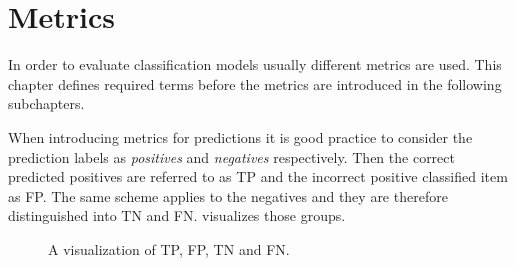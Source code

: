 \section{Metrics}
\label{chp:fundamentals:sec:metrics}

In order to evaluate classification models usually different metrics are used.
This chapter defines required terms before the metrics are introduced in the following subchapters.

When introducing metrics for predictions it is good practice to consider the prediction labels as \textit{positives} and \textit{negatives} respectively.
Then the correct predicted positives are referred to as \ac{TP} and the incorrect positive classified item as \ac{FP}.
The same scheme applies to the negatives and they are therefore distinguished into \ac{TN} and \ac{FN}.
 visualizes those groups. \parencite{Powers:2011}

\begin{figure}[htpb]
    \centering
    \def\svgwidth{\columnwidth}
    
    \caption[Visualization of True Positives]{A visualization of \ac{TP}, \ac{FP}, \ac{TN} and \ac{FN}.}\label{fig:metrics:tp_vis}
\end{figure}





